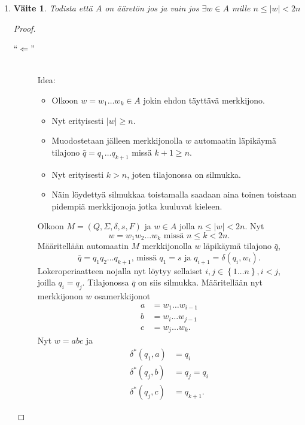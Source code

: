 \documentclass[a4paper,11pt,draft]{article}
\newtheorem*{claim}{Väite}
\newcommand{\set}[1]{{\left\{ #1 \right\}}}
\begin{document}
\begin{enumerate}
\begin{enumerate}
\begin{proof}
\begin{description}
      \end{description}
    \end{proof}
  \item
    \begin{claim}
      Todista että $A$ on ääretön jos ja vain jos $\exists w \in A$
      mille $n \le |w| < 2n$
    \end{claim}
    \begin{proof} \hfill \\
      \begin{description}
        \item[``$\Leftarrow$''] \hfill \\
          Idea:
          \begin{itemize}
            \item Olkoon $w = w_1 \ldots w_k \in A$ jokin ehdon
              täyttävä merkkijono.
            \item Nyt erityisesti $|w| \ge n$.
            \item Muodostetaan jälleen merkkijonolla $w$ automaatin
              läpikäymä tilajono $\bar{q} = q_1 \ldots q_{k+1}$ missä
              $k+1 \ge n$.
            \item Nyt erityisesti $k > n$, joten tilajonossa on
              silmukka.
            \item Näin löydettyä silmukkaa toistamalla saadaan aina
              toinen toistaan pidempiä merkkijonoja jotka kuuluvat kieleen.
          \end{itemize}
          Olkoon $M = (Q, \Sigma, \delta, s, F)$ ja $w \in A$ jolla $n
          \le |w| < 2n$. Nyt
          \begin{equation*}
            w = w_1w_2 \ldots w_k \textrm{ missä } n \le k < 2n \textrm{.}
          \end{equation*}
          Määritellään automaatin $M$ merkkijonolla $w$ läpikäymä
          tilajono $\bar{q}$,
          \begin{equation*}
            \bar{q} = q_1q_2 \ldots q_{k+1}
            \textrm{, missä } q_1 = s
            \textrm{ ja } q_{i+1} = \delta(q_i, w_i) \textrm{.}
          \end{equation*}
          Lokeroperiaatteen nojalla nyt löytyy sellaiset $i,j \in
          \set{1 \ldots n}, i < j$, joilla $q_i = q_j$. Tilajonossa
          $\bar{q}$ on siis silmukka. Määritellään nyt merkkijonon $w$
          osamerkkijonot
          \begin{align*}
            a & = w_1 \ldots w_{i-1} \\
            b & = w_i \ldots w_{j-1} \\
            c & = w_j \ldots w_k \textrm{.}
          \end{align*}
          Nyt $w = abc$ ja
          \begin{align*}
            \delta^*(q_1,a) & = q_i \\
            \delta^*(q_j,b) & = q_j = q_i \\
            \delta^*(q_j,c) & = q_{k+1} \textrm{.}
          \end{align*}


\end{description}
\end{proof}
\end{enumerate}
\end{enumerate}
\end{document}
